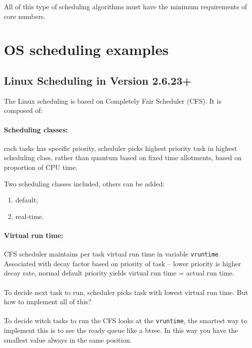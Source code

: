 All of this type of scheduling algorithms must have the minimum requirements of core numbers.

\newpage
\section{OS scheduling examples}

\subsection{Linux Scheduling in Version 2.6.23+}

The Linux scheduling is based on Completely Fair Scheduler (CFS). It is composed of:

\paragraph{Scheduling classes: } each tasks has specific priority, scheduler picks highest priority task in highest scheduling class, rather than quantum based on fixed time allotments, based on proportion of CPU time.

Two scheduling classes included, others can be added:

\begin{enumerate}
    \item default;
    \item real-time.
\end{enumerate}

\paragraph{Virtual run time:} CFS scheduler maintains per task virtual run time in variable \verb|vruntime|. Associated with decay factor based on priority of task – lower priority
is higher decay rate, normal default priority yields virtual run time = actual run time.

\paragraph{}
To decide next task to run, scheduler picks task with lowest virtual run time. But how to implement all of this?

\paragraph{}
To decide witch tasks to run the CFS looks at the \verb|vruntime|, the smartest way to implement this is to see the ready queue like a btree. In this way you have the smallest value always in the same position.


